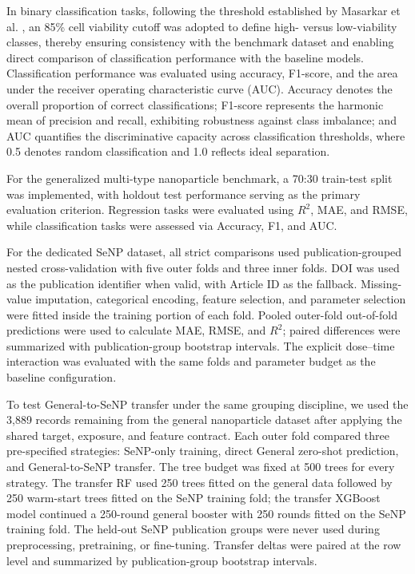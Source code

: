 In binary classification tasks, following the threshold established by Masarkar et al. \cite{masarkar2024}, an 85\% cell viability cutoff was adopted to define high- versus low-viability classes, thereby ensuring consistency with the benchmark dataset and enabling direct comparison of classification performance with the baseline models. Classification performance was evaluated using accuracy, F1-score, and the area under the receiver operating characteristic curve (AUC). Accuracy denotes the overall proportion of correct classifications; F1-score represents the harmonic mean of precision and recall, exhibiting robustness against class imbalance; and AUC quantifies the discriminative capacity across classification thresholds, where 0.5 denotes random classification and 1.0 reflects ideal separation.

For the generalized multi-type nanoparticle benchmark, a 70:30 train-test split was implemented, with holdout test performance serving as the primary evaluation criterion. Regression tasks were evaluated using $R^2$, MAE, and RMSE, while classification tasks were assessed via Accuracy, F1, and AUC.

For the dedicated SeNP dataset, all strict comparisons used publication-grouped nested cross-validation with five outer folds and three inner folds. DOI was used as the publication identifier when valid, with Article ID as the fallback. Missing-value imputation, categorical encoding, feature selection, and parameter selection were fitted inside the training portion of each fold. Pooled outer-fold out-of-fold predictions were used to calculate MAE, RMSE, and $R^2$; paired differences were summarized with publication-group bootstrap intervals. The explicit dose--time interaction was evaluated with the same folds and parameter budget as the baseline configuration.

To test General-to-SeNP transfer under the same grouping discipline, we used the 3,889 records remaining from the general nanoparticle dataset after applying the shared target, exposure, and feature contract. Each outer fold compared three pre-specified strategies: SeNP-only training, direct General zero-shot prediction, and General-to-SeNP transfer. The tree budget was fixed at 500 trees for every strategy. The transfer RF used 250 trees fitted on the general data followed by 250 warm-start trees fitted on the SeNP training fold; the transfer XGBoost model continued a 250-round general booster with 250 rounds fitted on the SeNP training fold. The held-out SeNP publication groups were never used during preprocessing, pretraining, or fine-tuning. Transfer deltas were paired at the row level and summarized by publication-group bootstrap intervals.

